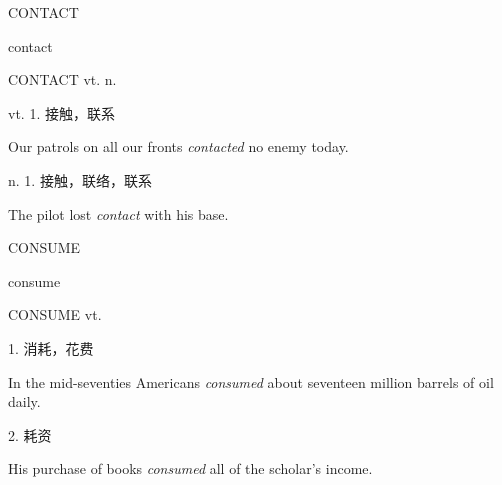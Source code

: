\begin{flashcard}{
CONTACT

contact
}
\begin{center}
CONTACT vt.  n. 
\end{center}
vt. 1. 接触，联系

Our patrols on all our fronts \textit{contacted} no enemy today.

n. 1. 接触，联络，联系

The pilot lost \textit{contact} with his base.

\end{flashcard}
\begin{flashcard}{
CONSUME

consume
}
\begin{center}
CONSUME vt. 
\end{center}
1. 消耗，花费

In the mid-seventies Americans \textit{consumed} about seventeen million barrels of oil daily.

2. 耗资

His purchase of books \textit{consumed} all of the scholar's income.

\end{flashcard}
